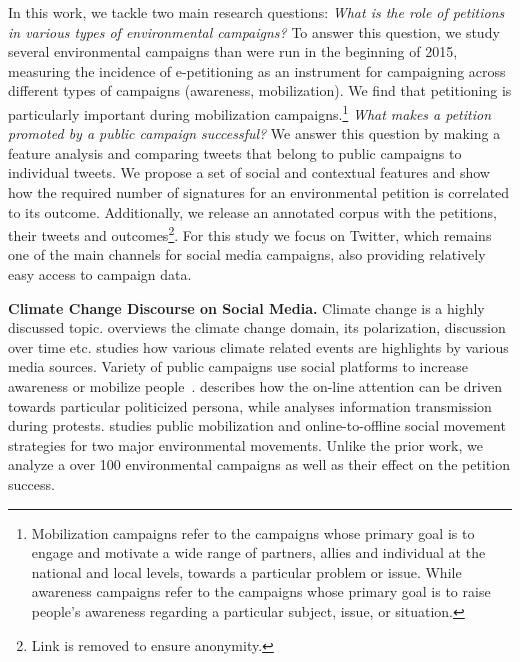In this work, we tackle two main research questions: 
\textit{What is the role of petitions in various types of environmental campaigns?}
To answer this question, we study several environmental campaigns than were run in the beginning of 2015, measuring the incidence of e-petitioning as an instrument for campaigning across different types of campaigns (awareness, mobilization). We find that petitioning is particularly important during mobilization campaigns.\footnote{Mobilization campaigns refer to the campaigns whose primary goal is to engage and motivate a wide range of partners, allies and individual at the national and local levels, towards a particular problem or issue. While awareness campaigns refer to the campaigns whose primary goal is to raise people’s awareness regarding a particular subject, issue, or situation.}
\textit{What makes a petition promoted by a public campaign successful?} We answer this question by making a feature analysis and comparing tweets that belong to public campaigns to individual tweets. 
%
We propose a set of social and contextual features and show how the required number of signatures for an environmental petition is  correlated to its outcome.
Additionally, we release an annotated corpus with the petitions, their tweets and outcomes\footnote{Link is removed to ensure anonymity.}.
For this study we focus on Twitter, which remains one of the main channels for social media campaigns, also providing relatively easy access to campaign data.

\textbf{Climate Change Discourse on Social Media.} Climate change is a highly discussed topic. \cite{Kirilenko2014} overviews the climate change domain, its polarization, discussion over time etc. \cite{Olteanu2015} studies how various climate related events are highlights by various media sources.
Variety of public campaigns use social platforms to increase awareness or mobilize people~\cite{Mahmud2014}.
\cite{Tufekci2013} describes how the on-line attention can be driven towards particular politicized persona, while \cite{gonzalez2013networked} analyses information transmission during protests.
\cite{hestres2013preaching} studies public mobilization and online-to-offline social movement strategies for two major environmental movements. Unlike the prior work, we analyze a over 100 environmental campaigns as well as their effect on the petition success.

